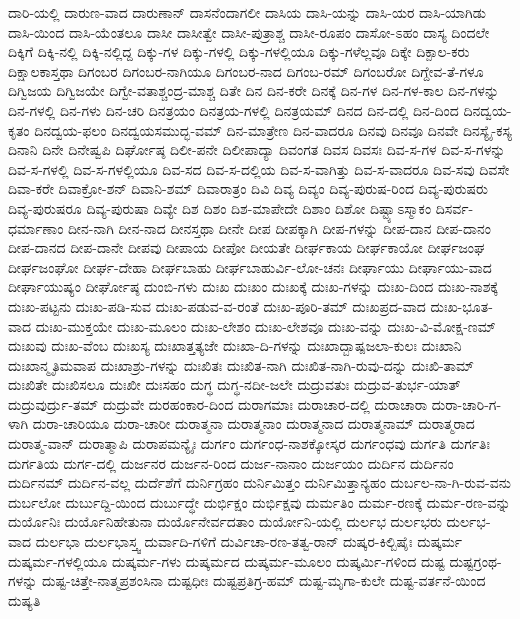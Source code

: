{ದಾರಿ-ಯಲ್ಲಿ
ದಾರುಣ-ವಾದ
ದಾರುಣಾನ್
ದಾಸನೆಂದಾಗಲೀ
ದಾಸಿಯ
ದಾಸಿ-ಯನ್ನು
ದಾಸಿ-ಯರ
ದಾಸಿ-ಯಾಗಿಡು
ದಾಸಿ-ಯಿಂದ
ದಾಸಿ-ಯೆಂತಲೂ
ದಾಸೀ
ದಾಸೀತ್ವೇ
ದಾಸೀ-ಪುತ್ರಾಶ್ಚ
ದಾಸೀ-ರೂಪಂ
ದಾಸೋ-ಽಹಂ
ದಾಸ್ಯ
ದಿಂದಲೇ
ದಿಕ್ಕಿಗೆ
ದಿಕ್ಕಿ-ನಲ್ಲಿ
ದಿಕ್ಕಿ-ನಲ್ಲಿದ್ದ
ದಿಕ್ಕು-ಗಳ
ದಿಕ್ಕು-ಗಳಲ್ಲಿ
ದಿಕ್ಕು-ಗಳಲ್ಲಿಯೂ
ದಿಕ್ಕು-ಗಳೆಲ್ಲವೂ
ದಿಕ್ಕೇ
ದಿಕ್ಪಾಲ-ಕರು
ದಿಕ್ಷಾಲಕಾಸ್ತಥಾ
ದಿಗಂಬರ
ದಿಗಂಬರ-ನಾಗಿಯೂ
ದಿಗಂಬರ-ನಾದ
ದಿಗಂಬ-ರಮ್
ದಿಗಂಬರೋ
ದಿಗ್ದೇವ-ತೆ-ಗಳೂ
ದಿಗ್ವಿಜಯ
ದಿಗ್ವಿಜಯೇ
ದಿಗ್ವೇ-ವತಾಶ್ಚಂದ್ರ-ಮಾಶ್ಚ
ದಿತೇ
ದಿನ
ದಿನ-ಕರೇ
ದಿನಕ್ಕೆ
ದಿನ-ಗಳ
ದಿನ-ಗಳ-ಕಾಲ
ದಿನ-ಗಳನ್ನು
ದಿನ-ಗಳಲ್ಲಿ
ದಿನ-ಗಳು
ದಿನ-ಚರಿ
ದಿನತ್ರಯಂ
ದಿನತ್ರಯ-ಗಳಲ್ಲಿ
ದಿನತ್ರಯಮ್
ದಿನದ
ದಿನ-ದಲ್ಲಿ
ದಿನ-ದಿಂದ
ದಿನದ್ವಯ-ಕೃತಂ
ದಿನದ್ವಯ-ಫಲಂ
ದಿನದ್ವಯಸಮುದ್ಭ-ವಮ್
ದಿನ-ಮಾತ್ರೇಣ
ದಿನ-ವಾದರೂ
ದಿನವು
ದಿನವೂ
ದಿನವೇ
ದಿನಸ್ಯೈ-ಕಸ್ಯ
ದಿನಾನಿ
ದಿನೇ
ದಿನೇಷ್ವಪಿ
ದಿರ್ಘೋಷ್ಠ
ದಿಲೀ-ಪನೇ
ದಿಲೀಪಾದ್ಯಾ
ದಿವಂಗತ
ದಿವಸ
ದಿವಸಃ
ದಿವ-ಸ-ಗಳ
ದಿವ-ಸ-ಗಳನ್ನು
ದಿವ-ಸ-ಗಳಲ್ಲಿ
ದಿವ-ಸ-ಗಳಲ್ಲಿಯೂ
ದಿವ-ಸದ
ದಿವ-ಸ-ದಲ್ಲಿಯ
ದಿವ-ಸ-ವಾಗಿತ್ತು
ದಿವ-ಸ-ವಾದರೂ
ದಿವ-ಸವು
ದಿವಸೇ
ದಿವಾ-ಕರೇ
ದಿವಾಕ್ರೋ-ಶನ್
ದಿವಾನಿ-ಶಮ್
ದಿವಾರಾತ್ರಂ
ದಿವಿ
ದಿವ್ಯ
ದಿವ್ಯಂ
ದಿವ್ಯ-ಪುರುಷ-ರಿಂದ
ದಿವ್ಯ-ಪುರುಷರು
ದಿವ್ಯ-ಪುರುಷರೂ
ದಿವ್ಯ-ಪುರುಷಾ
ದಿವ್ಯೇ
ದಿಶ
ದಿಶಂ
ದಿಶ-ಮಾಪೇದೇ
ದಿಶಾಂ
ದಿಶೋ
ದಿಷ್ಟ್ಯಾಽಸ್ಮಾಕಂ
ದಿಸರ್ವ-ಧರ್ಮಾಣಾಂ
ದೀನ-ನಾಗಿ
ದೀನ-ನಾದ
ದೀನಸ್ತಥಾ
ದೀನೇ
ದೀಪ
ದೀಪಕ್ಕಾಗಿ
ದೀಪ-ಗಳನ್ನು
ದೀಪ-ದಾನ
ದೀಪ-ದಾನಂ
ದೀಪ-ದಾನದ
ದೀಪ-ದಾನೇ
ದೀಪವು
ದೀಪಾಯ
ದೀಪೋ
ದೀಯತೇ
ದೀರ್ಘಕಾಯ
ದೀರ್ಘಕಾಯೋ
ದೀರ್ಘಜಂಘ
ದೀರ್ಘಜಂಘೋ
ದೀರ್ಘ-ದೇಹಾ
ದೀರ್ಘಬಾಹು
ದೀರ್ಘಬಾಹುರ್ವಿ-ಲೋ-ಚನಃ
ದೀರ್ಘಾಯು
ದೀರ್ಘಾಯು-ವಾದ
ದೀರ್ಘಾಯುಷ್ಯಂ
ದೀರ್ಘೋಷ್ಠ
ದುಂಬಿ-ಗಳು
ದುಃಖ
ದುಃಖಂ
ದುಃಖಕ್ಕೆ
ದುಃಖ-ಗಳನ್ನು
ದುಃಖ-ದಿಂದ
ದುಃಖ-ನಾಶಕ್ಕೆ
ದುಃಖ-ಪಟ್ಟನು
ದುಃಖ-ಪಡಿ-ಸುವ
ದುಃಖ-ಪಡುವ-ವ-ರಂತೆ
ದುಃಖ-ಪೂರಿ-ತಮ್
ದುಃಖಪ್ರದ-ವಾದ
ದುಃಖ-ಭೂತ-ವಾದ
ದುಃಖ-ಮುಕ್ತಯೇ
ದುಃಖ-ಮೂಲಂ
ದುಃಖ-ಲೇಶಂ
ದುಃಖ-ಲೇಶವೂ
ದುಃಖ-ವನ್ನು
ದುಃಖ-ವಿ-ಮೋಕ್ಷ-ಣಮ್
ದುಃಖವು
ದುಃಖ-ವೆಂಬ
ದುಃಖಸ್ಯ
ದುಃಖಾತ್ತತ್ಯಜೇ
ದುಃಖಾ-ದಿ-ಗಳನ್ನು
ದುಃಖಾದ್ಬಾಷ್ಪಜಲಾ-ಕುಲಃ
ದುಃಖಾನಿ
ದುಃಖಾನ್ಮೃತಿಮವಾಪ
ದುಃಖಾಶ್ರು-ಗಳನ್ನು
ದುಃಖಿತಃ
ದುಃಖಿತ-ನಾಗಿ
ದುಃಖಿತ-ನಾಗಿ-ರುವು-ದನ್ನು
ದುಃಖಿ-ತಾಮ್
ದುಃಖಿತೇ
ದುಃಖಿಸಲೂ
ದುಃಖೀ
ದುಃಸಹಂ
ದುಗ್ಧ
ದುಗ್ಧ-ನದೀ-ಜಲೇ
ದುದ್ರುವತುಃ
ದುದ್ರುವ-ತುರ್ಭ-ಯಾತ್
ದುದ್ರುವುರ್ದ್ರು-ತಮ್
ದುದ್ರುವೇ
ದುರಹಂಕಾರ-ದಿಂದ
ದುರಾಗಮಾಃ
ದುರಾಚಾರ-ದಲ್ಲಿ
ದುರಾಚಾರಾ
ದುರಾ-ಚಾರಿ-ಗ-ಳಾಗಿ
ದುರಾ-ಚಾರಿಯೂ
ದುರಾ-ಚಾರೀ
ದುರಾತ್ಮನಾ
ದುರಾತ್ಮನಾಂ
ದುರಾತ್ಮನಾದ
ದುರಾತ್ಮನಾಮ್
ದುರಾತ್ಮರಾದ
ದುರಾತ್ಮ-ವಾನ್
ದುರಾತ್ಮಾಪಿ
ದುರಾಪಮನ್ಯೈಃ
ದುರ್ಗಂ
ದುರ್ಗಂಧ-ನಾಶಕ್ಕೋಸ್ಕರ
ದುರ್ಗಂಧವು
ದುರ್ಗತಿ
ದುರ್ಗತಿಃ
ದುರ್ಗತಿಯ
ದುರ್ಗ-ದಲ್ಲಿ
ದುರ್ಜನರ
ದುರ್ಜನ-ರಿಂದ
ದುರ್ಜ-ನಾನಾಂ
ದುರ್ಜಯಂ
ದುರ್ದಿನ
ದುರ್ದಿನಂ
ದುರ್ದಿನಮ್
ದುರ್ದಿನ-ವಲ್ಲ
ದುರ್ದೆಶೆಗೆ
ದುರ್ನಿಗ್ರಹಂ
ದುರ್ನಿಮಿತ್ತಂ
ದುರ್ನಿಮಿತ್ತಾನ್ಯಹಂ
ದುರ್ಬಲ-ನಾ-ಗಿ-ರುವ-ವನು
ದುರ್ಬಲೋ
ದುರ್ಬುದ್ದಿ-ಯಿಂದ
ದುರ್ಬುದ್ಧೇ
ದುರ್ಭಿಕ್ಷಂ
ದುರ್ಭಿಕ್ಷವು
ದುರ್ಮತಿಂ
ದುರ್ಮ-ರಣಕ್ಕೆ
ದುರ್ಮ-ರಣ-ವನ್ನು
ದುರ್ಯೊನಿಃ
ದುರ್ಯೊನಿಹೇತುನಾ
ದುರ್ಯೊನೇರ್ವದತಾಂ
ದುರ್ಯೋನಿ-ಯಲ್ಲಿ
ದುರ್ಲಭ
ದುರ್ಲಭರು
ದುರ್ಲಭ-ವಾದ
ದುರ್ಲಭಾ
ದುರ್ಲಭಾಸ್ತ್ವ
ದುರ್ವಾದಿ-ಗಳಿಗೆ
ದುರ್ವಿಚಾ-ರಣ-ತತ್ವ-ರಾನ್
ದುಷ್ಕರ-ಕಿಲ್ಬಿಷೈಃ
ದುಷ್ಕರ್ಮ
ದುಷ್ಕರ್ಮ-ಗಳಲ್ಲಿಯೂ
ದುಷ್ಕರ್ಮ-ಗಳು
ದುಷ್ಕರ್ಮದ
ದುಷ್ಕರ್ಮ-ಮೂಲಂ
ದುಷ್ಕರ್ಮಿ-ಗಳಿಂದ
ದುಷ್ಟ
ದುಷ್ಟಗ್ರಂಥ-ಗಳನ್ನು
ದುಷ್ಟ-ಚಿತ್ತೇ-ನಾತ್ಮಪ್ರಶಂಸಿನಾ
ದುಷ್ಟಧೀಃ
ದುಷ್ಟಪ್ರತಿಗ್ರ-ಹಮ್
ದುಷ್ಟ-ಮೃಗಾ-ಕುಲೇ
ದುಷ್ಟ-ವರ್ತನೆ-ಯಿಂದ
ದುಷ್ಯತಿ
}
